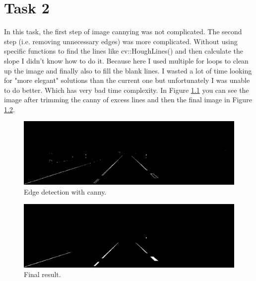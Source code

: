\chapter{Task 2}
In this task, the first step of image cannying was not complicated. The second step (i.e. removing unnecessary edges) was more complicated. Without using specific functions to find the lines like cv::HoughLines() and then calculate the slope I didn't know how to do it. Because here I used multiple for loops to clean up the image and finally also to fill the blank lines. I wasted a lot of time looking for "more elegant" solutions than the current one but unfortunately I was unable to do better. Which has very bad time complexity. In Figure  \ref{fig:2a} you can see the image after trimming the canny of excess lines and then the final image in Figure \ref{fig:2b}.

\begin{figure}[h]
	\centering
	\begin{minipage}{0.9\textwidth}
		\centering
		\includegraphics[width=\linewidth]{images/source/task2/1}
		\caption{Edge detection with canny.}
		\label{fig:2a}
        \end{minipage}
\end{figure}

\begin{figure}[h]
	\centering
        \begin{minipage}{0.9\textwidth}
        		\centering
		\includegraphics[width=\linewidth]{images/source/task2/2}
		\caption{Final result.}
		\label{fig:2b}
        \end{minipage}
\end{figure}


